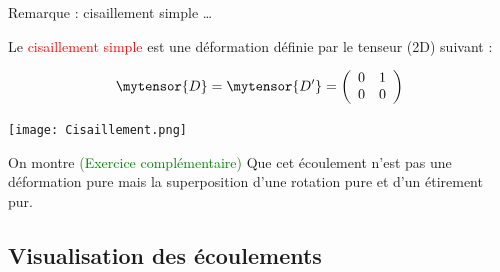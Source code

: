\begin{frame}{Remarque : cisaillement simple  \ldots}
\small

Le \textcolor{red}{cisaillement simple } est une déformation définie par le tenseur (2D) suivant :

\[
\mytensor{D} = \mytensor{D'} = 
	\left(
	\begin{array}{cc}
		0 & 1 
		\\
		0 & 0
	\end{array}
	\right)
\]

\bigskip

\begin{center}
	\texttt{[image: Cisaillement.png]}
\end{center}

\pause

\bigskip 
On montre \textcolor{green}{(Exercice complémentaire)} Que cet écoulement n'est pas une déformation pure mais la superposition d'une rotation pure et d'un étirement pur.

\end{frame}



\subsection{Visualisation des \'ecoulements}

%
%
%
%
%
